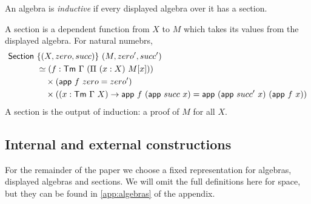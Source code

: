 \begin{definition}
An algebra is \emph{inductive} if every displayed algebra over it has a section.
\end{definition}
A section is a dependent function from $X$ to $M$ which takes its values from
the displayed algebra. For natural numebrs,
\begin{align*}
	\mta{Section}\  & \{(X, zero, succ)\}\ (M, zero', succ')                                                                                           \\
	                & \simeq (f : \Tm\ \Gamma\ (\Pi\ (x : X)\ M[x]))                                                                                   \\
	                & \quad \times (\mta{app}\ f\ zero = zero')                                                                                        \\
	                & \quad \times ((x : \Tm\ \Gamma\ X) \to \mta{app}\ f\ (\mta{app}\ succ\ x) = \mta{app}\ (\mta{app}\ succ'\ x)\ (\mta{app}\ f\ x))
\end{align*}
A section is the output of induction: a proof of $M$ for all $X$.

\subsection{Internal and external constructions}

For the remainder of the paper we choose a fixed representation for algebras,
displayed algebras and sections. We will omit the full definitions here for
space, but they can be found in \cref{app:algebras} of the appendix.

